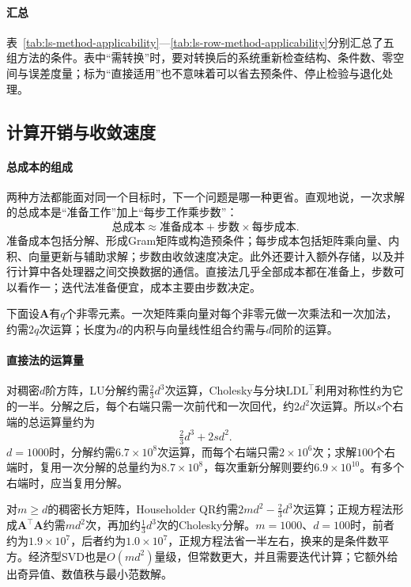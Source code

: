 \paragraph{汇总}
表~\ref{tab:ls-method-applicability}—\ref{tab:ls-row-method-applicability}分别汇总了五组方法的条件。表中“需转换”时，要对转换后的系统重新检查结构、条件数、零空间与误差度量；标为“直接适用”也不意味着可以省去预条件、停止检验与退化处理。



\subsection{计算开销与收敛速度}
\label{sec:ls-method-selection-cost}

\paragraph{总成本的组成}
两种方法都能面对同一个目标时，下一个问题是哪一种更省。直观地说，一次求解的总成本是“准备工作”加上“每步工作乘步数”：
\begin{equation}
 \text{总成本}\approx\text{准备成本}+\text{步数}\times\text{每步成本}.
 \label{eq:ls-method-selection-total-cost}
\end{equation}
准备成本包括分解、形成Gram矩阵或构造预条件；每步成本包括矩阵乘向量、内积、向量更新与辅助求解；步数由收敛速度决定。此外还要计入额外存储，以及并行计算中各处理器之间交换数据的通信。直接法几乎全部成本都在准备上，步数可以看作一；迭代法准备便宜，成本主要由步数决定。

下面设$\bm A$有$q$个非零元素。一次矩阵乘向量对每个非零元做一次乘法和一次加法，约需$2q$次运算；长度为$d$的内积与向量线性组合约需与$d$同阶的运算。

\paragraph{直接法的运算量}
对稠密$d$阶方阵，LU分解约需$\tfrac23d^3$次运算，Cholesky与分块$\mathrm{LDL}^\top$利用对称性约为它的一半。分解之后，每个右端只需一次前代和一次回代，约$2d^2$次运算。所以$s$个右端的总运算量约为
\begin{equation}
 \tfrac23d^3+2sd^2 .
 \label{eq:ls-direct-multiple-rhs-cost}
\end{equation}
$d=1000$时，分解约需$6.7\times10^8$次运算，而每个右端只需$2\times10^6$次；求解$100$个右端时，复用一次分解的总量约为$8.7\times10^8$，每次重新分解则要约$6.9\times10^{10}$。有多个右端时，应当复用分解。

对$m\geq d$的稠密长方矩阵，Householder QR约需$2md^2-\tfrac23d^3$次运算；正规方程法形成$\bm A^\top\bm A$约需$md^2$次，再加约$\tfrac13d^3$次的Cholesky分解。$m=1000$、$d=100$时，前者约为$1.9\times10^7$，后者约为$1.0\times10^7$，正规方程法省一半左右，换来的是条件数平方。经济型SVD也是$O(md^2)$量级，但常数更大，并且需要迭代计算；它额外给出奇异值、数值秩与最小范数解。

